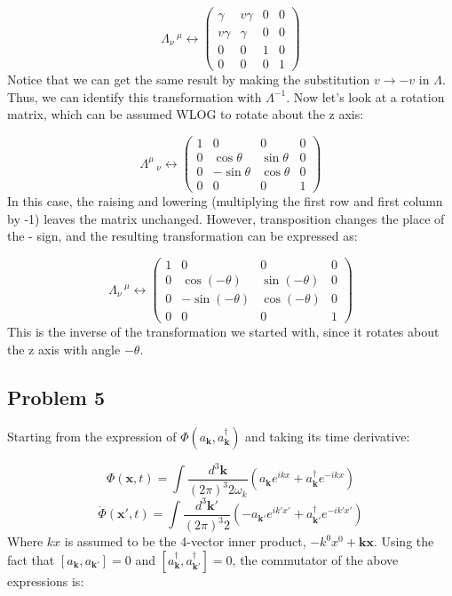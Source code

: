 \documentclass[12 pt]{article}
\begin{document}
\[   \Lambda_{\nu}\, ^{\mu} \leftrightarrow \left(  \begin{array}{cccc} 
	\gamma	& v\gamma	& 0	& 0 \\
	v\gamma	& \gamma		& 0	& 0 \\
	0		& 0			& 1	& 0 \\
	0		& 0			& 0	& 1 \end{array}    \right)  \]
Notice that we can get the same result by making the substitution $v \to -v$ in $\Lambda$. Thus, we can identify this transformation with $\Lambda^{-1}$. Now let's look at a rotation matrix, which can be assumed WLOG to rotate about the z axis:

\[ \Lambda^{\mu}\, _{\nu} \leftrightarrow \left(  \begin{array}{cccc} 
	1	& 0	& 0	& 0 \\
	0	& \cos \theta	& \sin \theta	& 0 \\
	0	& -\sin \theta	& \cos \theta	& 0 \\
	0	& 0	& 0	& 1 \end{array}    \right)  \]
In this case, the raising and lowering (multiplying the first row and first column by -1) leaves the matrix unchanged. However, transposition changes the place of the - sign, and the resulting transformation can be expressed as:

\[ \Lambda_{\nu}\, ^{\mu} \leftrightarrow \left(  \begin{array}{cccc} 
	1	& 0	& 0	& 0 \\
	0	& \cos (-\theta)	& \sin(-\theta)	& 0 \\
	0	& -\sin(-\theta)	& \cos(-\theta)	& 0 \\
	0	& 0	& 0	& 1 \end{array}    \right)  \]
This is the inverse of the transformation we started with, since it rotates about the z axis with angle $-\theta$.

\subsection*{Problem 5}
Starting from the expression of $\Phi (a_{\mathbf{k}},a^{\dagger}_{\mathbf{k}} ) $ and taking its time derivative:

\[ \Phi(\mathbf{x},t) = \int \frac{d^3 \mathbf{k}}{(2\pi)^3 2\omega_k} \left( a_{\mathbf{k}} e^{ikx} + a^{\dagger}_{\mathbf{k}} e^{-ikx}  \right) \]
\[ \dot \Phi(\mathbf{x'},t) = \int \frac{d^3 \mathbf{k'}}{(2\pi)^3 2} \left( -a_{\mathbf{k'}} e^{ik'x'} + a^{\dagger}_{\mathbf{k'}} e^{-ik'x'}  \right) \]
Where $kx$ is assumed to be the 4-vector inner product, $-k^0 x^0 + \mathbf{k}\mathbf{x}$. Using the fact that $[a_{\mathbf{k}}, a_{\mathbf{k'}}] = 0$ and $[a^{\dagger}_{\mathbf{k}}, a^{\dagger}_{\mathbf{k'}}] = 0$, the commutator of the above expressions is:
\end{document}
